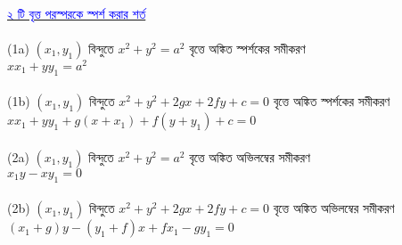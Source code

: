 \documentclass{article}
\begin{document}
	\\
	\href{https://www.youtube.com/watch?v=zsiv_hlMIR0}{\textcolor{blue}{২ টি বৃত্ত পরস্পরকে স্পর্শ করার শর্ত}}\\
	\\
	(1a) $(x_1,y_1)$ বিন্দুতে   $x^2+y^2=a^2$  বৃত্তে অঙ্কিত স্পর্শকের সমীকরণ \\
	$xx_1+yy_1=a^2$\\
	\\ 
	(1b) $(x_1,y_1)$ বিন্দুতে  $x^2+y^2+2gx+2fy+c=0$  বৃত্তে অঙ্কিত স্পর্শকের সমীকরণ \\   $xx_1+yy_1+g(x+x_1)+f(y+y_1)+c=0$\\
	\\ 
	(2a) $(x_1,y_1)$ বিন্দুতে   $x^2+y^2=a^2$  বৃত্তে অঙ্কিত অভিলম্বের  সমীকরণ \\
	$x_1y-xy_1=0$\\
	\\ 
	(2b) $(x_1,y_1)$ বিন্দুতে  $x^2+y^2+2gx+2fy+c=0$  বৃত্তে অঙ্কিত অভিলম্বের সমীকরণ \\   $(x_1+g)y-(y_1+f)x+fx_1-gy_1=0$\\
	
\end{document}
